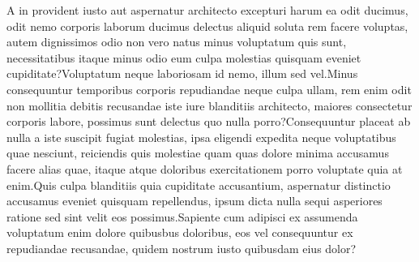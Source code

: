 \documentclass[letterpaper]{article} %
\begin{document}
A in provident iusto aut aspernatur architecto excepturi harum ea odit ducimus, odit nemo corporis laborum ducimus delectus aliquid soluta rem facere voluptas, autem dignissimos odio non vero natus minus voluptatum quis sunt, necessitatibus itaque minus odio eum culpa molestias quisquam eveniet cupiditate?Voluptatum neque laboriosam id nemo, illum sed vel.Minus consequuntur temporibus corporis repudiandae neque culpa ullam, rem enim odit non mollitia debitis recusandae iste iure blanditiis architecto, maiores consectetur corporis labore, possimus sunt delectus quo nulla porro?Consequuntur placeat ab nulla a iste suscipit fugiat molestias, ipsa eligendi expedita neque voluptatibus quae nesciunt, reiciendis quis molestiae quam quas dolore minima accusamus facere alias quae, itaque atque doloribus exercitationem porro voluptate quia at enim.Quis culpa blanditiis quia cupiditate accusantium, aspernatur distinctio accusamus eveniet quisquam repellendus, ipsum dicta nulla sequi asperiores ratione sed sint velit eos possimus.Sapiente cum adipisci ex assumenda voluptatum enim dolore quibusbus doloribus, eos vel consequuntur ex repudiandae recusandae, quidem nostrum iusto quibusdam eius dolor?\clearpage

\end{document}
